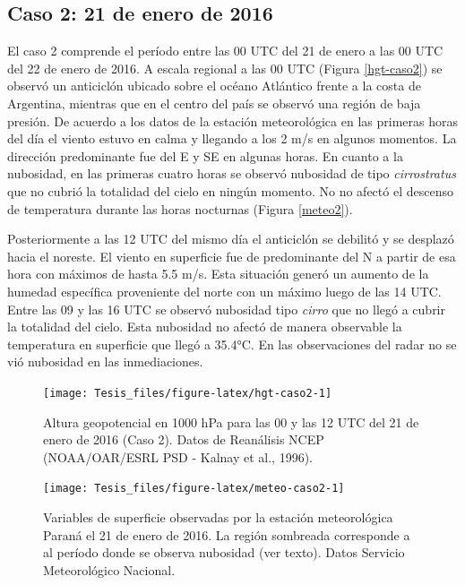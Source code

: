 \documentclass[12pt,spanish,oneside, a4paper]{book}
\begin{document}
\subsection{Caso 2: 21 de enero de
2016}\label{caso-2-21-de-enero-de-2016}

El caso 2 comprende el período entre las 00 UTC del 21 de enero a las 00
UTC del 22 de enero de 2016. A escala regional a las 00 UTC (Figura
\ref{hgt-caso2}) se observó un anticiclón ubicado sobre el océano
Atlántico frente a la costa de Argentina, mientras que en el centro del
país se observó una región de baja presión. De acuerdo a los datos de la
estación meteorológica en las primeras horas del día el viento estuvo en
calma y llegando a los 2 m/s en algunos momentos. La dirección
predominante fue del E y SE en algunas horas. En cuanto a la nubosidad,
en las primeras cuatro horas se observó nubosidad de tipo
\emph{cirrostratus} que no cubrió la totalidad del cielo en ningún
momento. No no afectó el descenso de temperatura durante las horas
nocturnas (Figura \ref{meteo2}).

Posteriormente a las 12 UTC del mismo día el anticiclón se debilitó y se
desplazó hacia el noreste. El viento en superficie fue de predominante
del N a partir de esa hora con máximos de hasta 5.5 m/s. Esta situación
generó un aumento de la humedad específica proveniente del norte con un
máximo luego de las 14 UTC. Entre las 09 y las 16 UTC se observó
nubosidad tipo \emph{cirro} que no llegó a cubrir la totalidad del
cielo. Esta nubosidad no afectó de manera observable la temperatura en
superficie que llegó a 35.4°C. En las observaciones del radar no se vió
nubosidad en las inmediaciones.

\begin{figure}

{\centering \texttt{[image: Tesis\_files/figure-latex/hgt-caso2-1]} 

}

\caption{Altura geopotencial en 1000 hPa para las 00 y las 12 UTC del 21 de enero de 2016 (Caso 2). Datos de Reanálisis NCEP (NOAA/OAR/ESRL PSD - Kalnay et al., 1996). \label{hgt-caso2}}\label{fig:hgt-caso2}
\end{figure}

\begin{figure}

{\centering \texttt{[image: Tesis\_files/figure-latex/meteo-caso2-1]} 

}

\caption{Variables de superficie observadas por la estación meteorológica Paraná el 21 de enero de 2016. La región sombreada corresponde a al período donde se observa nubosidad (ver texto). Datos Servicio Meteorológico Nacional. \label{meteo2}}\label{fig:meteo-caso2}
\end{figure}
\end{document}
